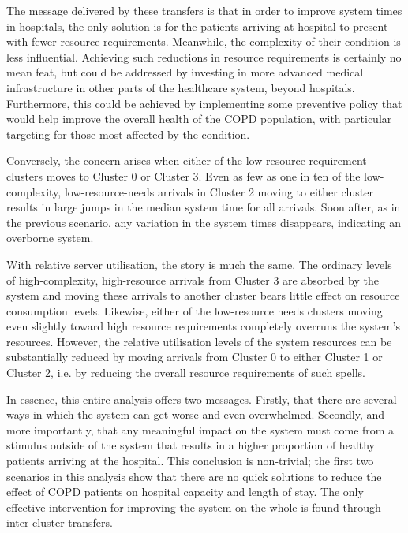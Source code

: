 \documentclass[]{interact}
\theoremstyle{plain}%
\theoremstyle{definition}
\theoremstyle{remark}
\begin{document}
\begin{table}
    \centering%
    \resizebox{\textwidth}{!}{}
    \caption{%
        Proportional changes in median relative utilisation for selected cluster
        transfers
    }\label{tab:moving_util}
\end{table}

The message delivered by these transfers is that in order to improve system
times in hospitals, the only solution is for the patients arriving at hospital
to present with fewer resource requirements. Meanwhile, the complexity of their
condition is less influential. Achieving such reductions in resource
requirements is certainly no mean feat, but could be addressed by investing in
more advanced medical infrastructure in other parts of the healthcare system,
beyond hospitals. Furthermore, this could be achieved by implementing some
preventive policy that would help improve the overall health of the COPD
population, with particular targeting for those most-affected by the condition.

Conversely, the concern arises when either of the low resource requirement
clusters moves to Cluster 0 or Cluster 3. Even as few as one in ten of the
low-complexity, low-resource-needs arrivals in Cluster 2 moving to either
cluster results in large jumps in the median system time for all arrivals. Soon
after, as in the previous scenario, any variation in the system times
disappears, indicating an overborne system.

With relative server utilisation, the story is much the same. The ordinary
levels of high-complexity, high-resource arrivals from Cluster 3 are absorbed by
the system and moving these arrivals to another cluster bears little effect on
resource consumption levels. Likewise, either of the low-resource needs clusters
moving even slightly toward high resource requirements completely overruns the
system's resources. However, the relative utilisation levels of the system
resources can be substantially reduced by moving arrivals from Cluster 0 to
either Cluster 1 or Cluster 2, i.e. by reducing the overall resource
requirements of such spells.

In essence, this entire analysis offers two messages. Firstly, that there are
several ways in which the system can get worse and even overwhelmed. Secondly,
and more importantly, that any meaningful impact on the system must come from a
stimulus outside of the system that results in a higher proportion of healthy
patients arriving at the hospital. This conclusion is non-trivial; the first two
scenarios in this analysis show that there are no quick solutions to reduce the
effect of COPD patients on hospital capacity and length of stay. The only
effective intervention for improving the system on the whole is found through
inter-cluster transfers.
\end{document}
